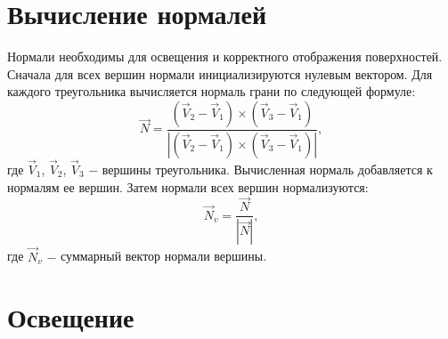 

\section{Вычисление нормалей}

Нормали необходимы для освещения и корректного отображения поверхностей. Сначала для всех вершин нормали инициализируются нулевым вектором. Для каждого треугольника вычисляется нормаль грани по следующей формуле:
\begin{equation}
    \vec{N} = \frac{(\vec{V}_2 - \vec{V}_1) \times (\vec{V}_3 - \vec{V}_1)}{|(\vec{V}_2 - \vec{V}_1) \times (\vec{V}_3 - \vec{V}_1)|},
\end{equation}
где $\vec{V}_1$, $\vec{V}_2$, $\vec{V}_3$ $-$ вершины треугольника. Вычисленная нормаль добавляется к нормалям ее вершин. Затем нормали всех вершин нормализуются:
\begin{equation}
    \vec{N}_v = \frac{\vec{N}}{|\vec{N}|},
\end{equation}
где $\vec{N}_v$ $-$ суммарный вектор нормали вершины.

\section{Освещение}

